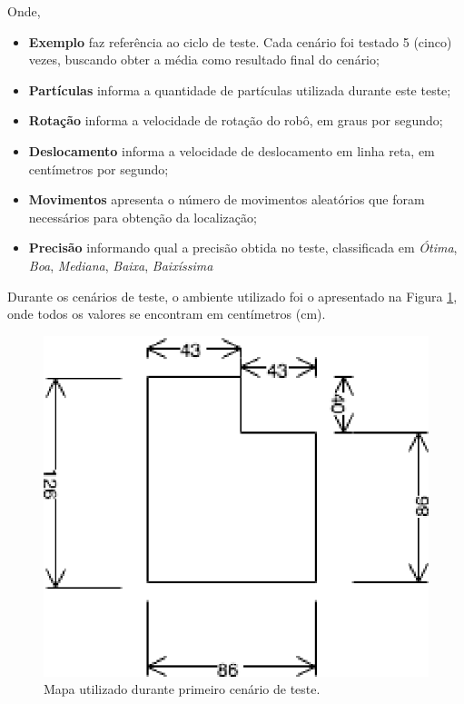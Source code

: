 Onde,
\begin{itemize}
  \item \textbf{Exemplo} faz referência ao ciclo de teste. Cada cenário foi testado 5 (cinco) vezes, buscando obter a média como resultado
  final do cenário;

  \item \textbf{Partículas} informa a quantidade de partículas utilizada durante este teste;

  \item \textbf{Rotação} informa a velocidade de rotação do robô, em graus por segundo;

  \item \textbf{Deslocamento} informa a velocidade de deslocamento em linha reta, em centímetros por segundo;

  \item \textbf{Movimentos} apresenta o número de movimentos aleatórios que foram necessários para obtenção da localização;

  \item \textbf{Precisão} informando qual a precisão obtida no teste, classificada em \textit{Ótima}, \textit{Boa}, \textit{Mediana},
  \textit{Baixa}, \textit{Baixíssima}
\end{itemize}

Durante os cenários de teste, o ambiente utilizado foi o apresentado na Figura \ref{img:map1}, onde todos os
valores se encontram em centímetros (cm).

\begin{figure}[H]
	\centering
	\includegraphics[scale=1.3]{figuras/map1.eps}
	\caption[Primeiro Cenário de Teste]{Mapa utilizado durante primeiro cenário de teste.}
	\label{img:map1}
\end{figure}

